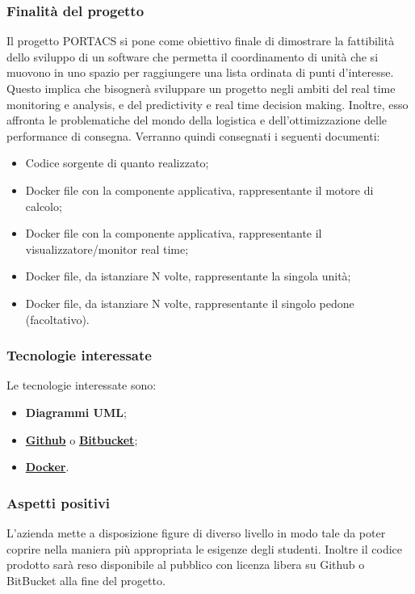 \subsubsection{Finalità del progetto}
Il progetto PORTACS si pone come obiettivo finale di dimostrare la fattibilità dello sviluppo di un software che permetta il coordinamento di unità che si muovono in uno spazio per raggiungere una lista ordinata di punti d'interesse. Questo implica che bisognerà sviluppare un progetto negli ambiti del real time monitoring e analysis, e del predictivity e real time decision making. Inoltre, esso affronta le problematiche del mondo della logistica e dell'ottimizzazione delle performance di consegna.
Verranno quindi consegnati i seguenti documenti:
\begin{itemize}
	\item Codice sorgente di quanto realizzato;
	\item Docker file con la componente applicativa, rappresentante il motore di calcolo;
	\item Docker file con la componente applicativa, rappresentante il visualizzatore/monitor real time;
	\item Docker file, da istanziare N volte, rappresentante la singola unità;
	\item Docker file, da istanziare N volte, rappresentante il singolo pedone (facoltativo).
\end{itemize}
\subsubsection{Tecnologie interessate}
Le tecnologie interessate sono:
\begin{itemize}
	\item \textbf{Diagrammi UML};
	\item \textbf{\href{https://github.com/about}{Github}} o \textbf{\href{https://bitbucket.org/product/guides/getting-started/overview}{Bitbucket}};	
	\item \textbf{\href{https://www.docker.com/why-docker}{Docker}}.
\end{itemize}
\subsubsection{Aspetti positivi}
L'azienda mette a disposizione figure di diverso livello in modo tale da poter coprire nella maniera più appropriata le esigenze degli studenti.
Inoltre il codice prodotto sarà reso disponibile al pubblico con licenza libera su Github o BitBucket alla fine del progetto.
